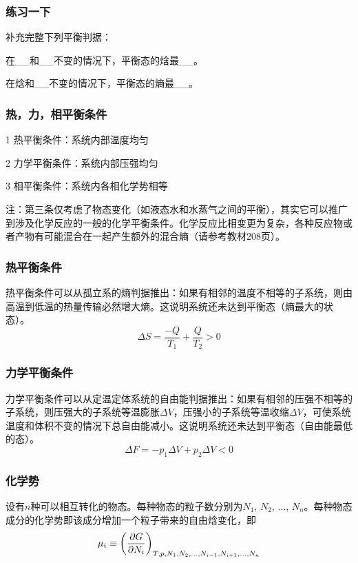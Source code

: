 \documentclass[CJK,14pt]{beamer}
\begin{document}
\begin{frame}
  \frametitle{练习一下}
  
  补充完整下列平衡判据：
  \bitem
\item{在\_\_和\_\_不变的情况下，平衡态的焓最\_\_。}
\item{在焓和\_\_不变的情况下，平衡态的熵最\_\_。}
  \eitem
  
\end{frame}


\begin{frame}
\frametitle{热，力，相平衡条件}

\bitem
\item[1]{\blue 热平衡条件：系统内部温度均匀}
\item[2]{\blue 力学平衡条件：系统内部压强均匀}
\item[3]{\blue 相平衡条件：系统内各相化学势相等}
\eitem

{\small
注：第三条仅考虑了物态变化（如液态水和水蒸气之间的平衡），其实它可以推广到涉及化学反应的一般的化学平衡条件。化学反应比相变更为复杂，各种反应物或者产物有可能混合在一起产生额外的混合熵（请参考教材208页）。
}
\end{frame}


\begin{frame}
\frametitle{热平衡条件}

热平衡条件可以从孤立系的熵判据推出：如果有相邻的温度不相等的子系统，则由高温到低温的热量传输必然增大熵。这说明系统还未达到平衡态（熵最大的状态）。
$$\Delta S = \frac{-Q}{T_1} + \frac{Q}{T_2} > 0$$
\end{frame}

\begin{frame}
\frametitle{力学平衡条件}

力学平衡条件可以从定温定体系统的自由能判据推出：如果有相邻的压强不相等的子系统，则压强大的子系统等温膨胀$\Delta V$，压强小的子系统等温收缩$\Delta V$，可使系统温度和体积不变的情况下总自由能减小。这说明系统还未达到平衡态（自由能最低的态）。
$$\Delta F = -p_1 \Delta V + p_2 \Delta V < 0 $$

\end{frame}


\begin{frame}
  \frametitle{化学势}
  设有$n$种可以相互转化的物态。每种物态的粒子数分别为$N_1$, $N_2$, $\ldots$, $N_n$。每种物态成分的{\blue 化学势即该成分增加一个粒子带来的自由焓变化}，即
$$ \mu_i \equiv \left(\frac{\partial G}{\partial N_i}\right)_{T,p,N_1, N_2, \ldots, N_{i-1}, N_{i+1}, \ldots, N_n} $$
\end{frame}
  
\end{document}
